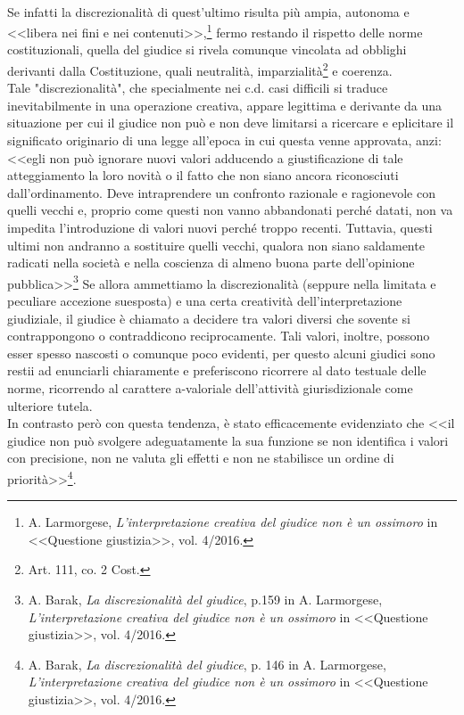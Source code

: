 \\Se infatti la discrezionalità di quest'ultimo risulta più ampia, autonoma e <<libera nei fini e nei contenuti>>,\footnote{A. Larmorgese, \textit{L’interpretazione creativa del giudice non è un ossimoro} in <<Questione giustizia>>, vol. 4/2016.} fermo restando il rispetto delle norme costituzionali, quella del giudice si rivela comunque vincolata ad obblighi derivanti dalla Costituzione, quali neutralità, imparzialità\footnote{Art. 111, co. 2 Cost.} e coerenza.
\\Tale "discrezionalità", che specialmente nei c.d. casi difficili si traduce inevitabilmente in una operazione creativa, appare legittima e derivante da una situazione per cui il giudice non può e non deve limitarsi a ricercare e eplicitare il significato originario di una legge all'epoca in cui questa venne approvata, anzi: <<egli non può ignorare nuovi valori adducendo a giustificazione di tale atteggiamento la loro novità o il fatto che non siano ancora riconosciuti dall'ordinamento. Deve intraprendere un confronto razionale e ragionevole con quelli vecchi e, proprio come questi non vanno abbandonati perché datati, non va impedita l'introduzione di valori nuovi perché troppo recenti. Tuttavia, questi ultimi non andranno a sostituire quelli vecchi, qualora non siano saldamente radicati nella società e nella coscienza di almeno buona parte dell'opinione pubblica>>\footnote{A. Barak, \textit{La discrezionalità del giudice}, p.159 in A. Larmorgese, \textit{L’interpretazione creativa del giudice non è un ossimoro} in <<Questione giustizia>>, vol. 4/2016. }
Se allora ammettiamo la discrezionalità (seppure nella limitata e peculiare accezione suesposta) e una certa creatività dell'interpretazione giudiziale, il giudice è chiamato a decidere tra valori diversi che sovente si contrappongono o contraddicono reciprocamente. 
Tali valori, inoltre, possono esser spesso nascosti o comunque poco evidenti, per questo alcuni giudici sono restii ad enunciarli chiaramente e preferiscono ricorrere al dato testuale delle norme, ricorrendo al carattere a-valoriale dell'attività giurisdizionale come ulteriore tutela. 
\\In contrasto però con questa tendenza, è stato efficacemente evidenziato che <<il giudice non può svolgere adeguatamente la sua funzione se non identifica i valori con precisione, non ne valuta gli effetti e non ne stabilisce un ordine di priorità>>\footnote{A. Barak, \textit{La discrezionalità del giudice}, p. 146 in A. Larmorgese, \textit{L’interpretazione creativa del giudice non è un ossimoro} in <<Questione giustizia>>, vol. 4/2016. }.
